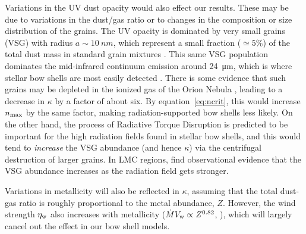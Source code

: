 Variations in the UV dust opacity would also effect our results.
These may be due to variations in the dust/gas ratio or to changes in
the composition or size distribution of the grains.  The UV opacity is
dominated by very small grains (VSG) with radius
\(a \sim \SI{10}{nm}\), which represent a small fraction
(\(\simeq 5\%\)) of the total dust mass in standard grain mixtures
\citep{Desert:1990a}.  This same VSG population dominates the
mid-infrared continuum emission around \SI{24}{\um}, which is where
stellar bow shells are most easily detected \citep{Meyer:2016a,
  Kobulnicky:2016a}. There is some evidence that such grains may be
depleted in the ionized gas of the Orion Nebula \citep{Salgado:2016a},
leading to a decrease in \(\kappa\) by a factor of about six.  By
equation~\eqref{eq:ncrit}, this would increase \(n_{\text{max}}\) by the same
factor, making radiation-supported bow shells less likely.  On the other
hand, the process of Radiative Torque Disruption is predicted to be
important \citep{Hoang:2018a} for the high radiation fields found in
stellar bow shells, and this would tend to \emph{increase} the VSG abundance
(and hence \(\kappa\)) via the centrifugal destruction of larger grains.
In LMC \hii{} regions, \citet{Stephens:2014b} find observational
evidence that the VSG abundance increases as the radiation field gets
stronger.

Variations in metallicity will also be reflected in \(\kappa\), assuming
that the total dust-gas ratio is roughly proportional to the metal
abundance, \(Z\).  However, the wind strength \(\eta_{\text{w}}\) also
increases with metallicity (\(\dot{M} V_{\text{w}} \propto Z^{0.82}\),
\citealp{Vink:2001a}), which will largely cancel out the effect in our
bow shell models.





